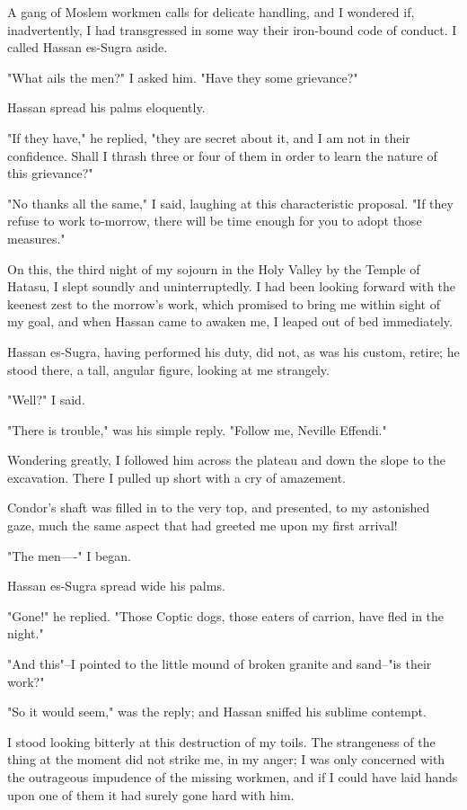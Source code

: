A gang of Moslem workmen calls for delicate handling, and I wondered
if, inadvertently, I had transgressed in some way their iron-bound
code of conduct. I called Hassan es-Sugra aside.

"What ails the men?" I asked him. "Have they some grievance?"

Hassan spread his palms eloquently.

"If they have," he replied, "they are secret about it, and I am not in
their confidence. Shall I thrash three or four of them in order to
learn the nature of this grievance?"

"No thanks all the same," I said, laughing at this characteristic
proposal. "If they refuse to work to-morrow, there will be time enough
for you to adopt those measures."

On this, the third night of my sojourn in the Holy Valley by the
Temple of Hatasu, I slept soundly and uninterruptedly. I had been
looking forward with the keenest zest to the morrow's work, which
promised to bring me within sight of my goal, and when Hassan came to
awaken me, I leaped out of bed immediately.

Hassan es-Sugra, having performed his duty, did not, as was his
custom, retire; he stood there, a tall, angular figure, looking at me
strangely.

"Well?" I said.

"There is trouble," was his simple reply. "Follow me, Neville
Effendi."

Wondering greatly, I followed him across the plateau and down the
slope to the excavation. There I pulled up short with a cry of
amazement.

Condor's shaft was filled in to the very top, and presented, to my
astonished gaze, much the same aspect that had greeted me upon my
first arrival!

"The men----" I began.

Hassan es-Sugra spread wide his palms.

"Gone!" he replied. "Those Coptic dogs, those eaters of carrion, have
fled in the night."

"And this"--I pointed to the little mound of broken granite and
sand--"is their work?"

"So it would seem," was the reply; and Hassan sniffed his sublime
contempt.

I stood looking bitterly at this destruction of my toils. The
strangeness of the thing at the moment did not strike me, in my anger;
I was only concerned with the outrageous impudence of the missing
workmen, and if I could have laid hands upon one of them it had surely
gone hard with him.

